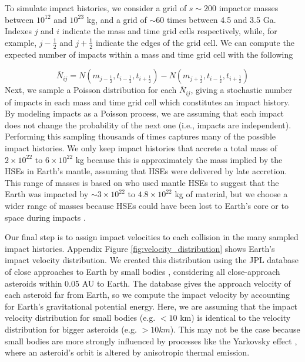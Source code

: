 \documentclass[manuscript]{aastex63}
\begin{document}
To simulate impact histories, we consider a grid of $s\sim 200$ impactor masses between $10^{12}$ and $10^{23}$ kg, and a grid of $\sim 60$ times between 4.5 and 3.5 Ga. Indexes $j$ and $i$ indicate the mass and time grid cells respectively, while, for example, $j-\frac{1}{2}$ and $j+\frac{1}{2}$ indicate the edges of the grid cell. We can compute the expected number of impacts within a mass and time grid cell with the following

\begin{equation}
  \overline{N}_{ij} = N(m_{j-\frac{1}{2}},t_{i-\frac{1}{2}},t_{i+\frac{1}{2}}) - N(m_{j+\frac{1}{2}},t_{i-\frac{1}{2}},t_{i+\frac{1}{2}})
\end{equation}
Next, we sample a Poisson distribution for each $\overline{N}_{ij}$, giving a stochastic number of impacts in each mass and time grid cell which constitutes an impact history. By modeling impacts as a Poisson process, we are assuming that each impact does not change the probability of the next one (i.e., impacts are independent). Performing this sampling thousands of times captures many of the possible impact histories. We only keep impact histories that accrete a total mass of $2 \times 10^{22}$ to $6 \times 10^{22}$ kg because this is approximately the mass implied by the HSEs in Earth's mantle, assuming that HSEs were delivered by late accretion. This range of masses is based on \citet{Day_2015} who used mantle HSEs to suggest that the Earth was impacted by $\sim 3 \times 10^{22}$ to $4.8 \times 10^{22}$ kg of material, but we choose a wider range of masses because HSEs could have been lost to Earth's core or to space during impacts \citep{Marchi_2018}.

Our final step is to assign impact velocities to each collision in the many sampled impact histories. Appendix Figure \ref{fig:velocity_distribution} shows Earth's impact velocity distribution. We created this distribution using the JPL database of close approaches to Earth by small bodies \citep{Park_2023}, considering all close-approach asteroids within 0.05 AU to Earth. The database gives the approach velocity of each asteroid far from Earth, so we compute the impact velocity by accounting for Earth's gravitational potential energy. Here, we are assuming that the impact velocity distribution for small bodies (e.g. $< 10$ km) is identical to the velocity distribution for bigger asteroids (e.g. $> 10 km$). This may not be the case because small bodies are more strongly influenced by processes like the Yarkovsky effect \citep{Bottke_2006}, where an asteroid's orbit is altered by anisotropic thermal emission.
\end{document}
